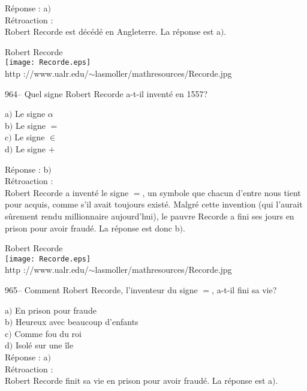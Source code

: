 ﻿\documentclass[letterpaper, 12pt]{article}
\begin{document}
R\'eponse : a$)$\\

R\'etroaction : \\
Robert Recorde est d\'ec\'ed\'e en Angleterre. La r\'eponse est a$)$.\\

        \begin{center}
        Robert Recorde\\
    \texttt{[image: Recorde.eps]}\\
        {\footnotesize http
://www.ualr.edu/$\sim$lasmoller/mathresources/Recorde.jpg}
    \end{center}

964-- Quel signe Robert Recorde a-t-il invent\'e en 1557?

a$)$ Le signe $\alpha$ \\
b$)$ Le signe $=$ \\
c$)$ Le signe $\in$  \\
d$)$ Le signe $+$

R\'eponse : b$)$\\

R\'etroaction : \\
Robert Recorde a invent\'e le signe $=$, un symbole que chacun
d'entre nous tient pour acquis, comme s'il avait toujours exist\'e.
Malgr\'e cette invention (qui l'aurait s\^urement rendu millionnaire
aujourd'hui), le pauvre Recorde a fini
ses jours en prison pour avoir fraud\'e. La r\'eponse est donc b$)$.\\

        \begin{center}
        Robert Recorde\\
    \texttt{[image: Recorde.eps]}\\
        {\footnotesize http
://www.ualr.edu/$\sim$lasmoller/mathresources/Recorde.jpg}
    \end{center}

965-- Comment Robert Recorde, l'inventeur du signe $=$, a-t-il fini
sa vie?

a$)$ En prison pour fraude \\
b$)$ Heureux avec beaucoup d'enfants  \\
c$)$ Comme fou du roi \\
d$)$ Isol\'e sur une \^ile \\

R\'eponse : a$)$\\

R\'etroaction :\\
Robert Recorde finit sa vie en prison pour avoir fraud\'e. La r\'eponse est
a$)$.\\
\end{document}
